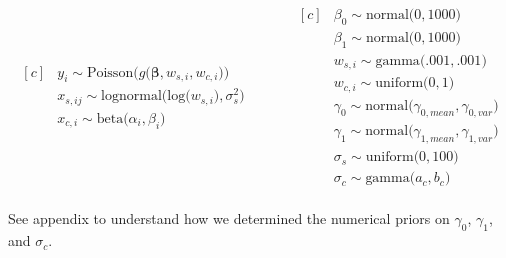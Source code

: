 \documentclass[12pt, oneside]{article}
\begin{document}
\begin{enumerate}[leftmargin=*]
\begin{equation*}
\begin{aligned}[c]
&y_{i} \sim \textrm{Poisson} \big(g\big(\bm{\beta}, w_{s,i}, w_{c,i}\big)\big) \\
&x_{s,ij} \sim \textrm{lognormal} \big(\textrm{log}\big(w_{s,i}\big), \sigma^{2}_{s}\big) \\
& x_{c,i} \sim \textrm{beta}\big(\alpha_{i}, \beta_{i}\big) \\
\end{aligned}\quad\quad\quad
\begin{aligned}[c]
&\beta_{0} \sim \textrm{normal} \big(0, 1000) \\
&\beta_{1} \sim \textrm{normal} \big(0, 1000) \\
&w_{s,i} \sim \textrm{gamma} \big(.001, .001) \\
&w_{c,i} \sim \textrm{uniform} \big(0, 1) \\
&\gamma_{0} \sim \textrm{normal} \big( \gamma_{0,mean}, \gamma_{0,var}) \\
&\gamma_{1} \sim \textrm{normal} \big( \gamma_{1,mean}, \gamma_{1,var}) \\
&\sigma_{s} \sim \textrm{uniform} \big(0, 100) \\
&\sigma_{c} \sim \textrm{gamma} \big(a_{c},b_{c}\big)\\
\end{aligned}
\end{equation*}

\vspace{10 mm}
See appendix to understand how we determined the numerical priors on $\gamma_{0}$, $\gamma_{1}$, and $\sigma_{c}$.



\end{enumerate}
\end{document}
